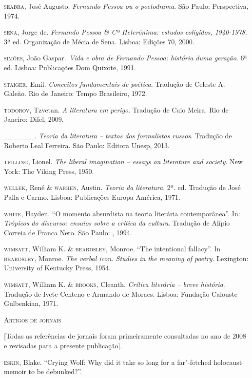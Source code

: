 \begin{Parskip}
\textsc{seabra}, José Augusto. \emph{Fernando Pessoa ou o poetodrama}.
São Paulo: Perspectiva, 1974.

\textsc{sena}, Jorge de. \emph{Fernando Pessoa \& Cª Heterónima:
estudos coligidos, 1940-1978}. 3ª ed. Organização de Mécia de Sena.
Lisboa: Edições 70, 2000.

\textsc{simões}, João Gaspar.~\emph{Vida e obra de Fernando Pessoa:
história duma geração}. 6ª ed. Lisboa: Publicações Dom Quixote, 1991.

\textsc{staiger}, Emil. \emph{Conceitos fundamentais de poética.}
Tradução de Celeste A. Galeão. Rio de Janeiro: Tempo Brasileiro, 1972.

\textsc{todorov, T}zvetan. \emph{A literatura em perigo}. Tradução de
Caio Meira. Rio de Janeiro: Difel, 2009.

\_\_\_\_\_\_. \emph{Teoria da literatura -- textos dos formalistas
russos}. Tradução de Roberto Leal Ferreira. São Paulo: Editora Unesp,
2013.

\textsc{trilling}, Lionel. \emph{The liberal imagination -- essays on
literature and society}. New York: The Viking Press, 1950.

\textsc{wellek,} René \textsc{\& warren,} Austin. \emph{Teoria da
literatura}. 2ª. ed. Tradução de José Palla e Carmo. Lisboa: Publicações
Europa América, 1971.

\textsc{white}, Hayden. ``O momento absurdista na teoria literária
contemporânea''. In: \emph{Trópicos do discurso: ensaios sobre a
crítica da cultura}. Tradução de Alípio Correia de Franca Neto. São
Paulo: , 1994.

\textsc{wimsatt}, William K. \& \textsc{beardsley}, Monroe. ``The
intentional fallacy''. In \textsc{beardsley}, Monroe. \emph{The verbal
icon. Studies in the meaning of poetry}. Lexington: University of
Kentucky Press, 1954.

\textsc{wimsatt}, William K. \& \textsc{brooks}, Cleanth. \emph{Crítica
literária -- breve história}. Tradução de Ivete Centeno e Armando de
Moraes. Lisboa: Fundação Calouste Gulbenkian, 1971.

\pagebreak

\textsc{Artigos de jornais}

{[}Todas as referências de jornais foram primeiramente consultadas no
ano de 2008 e revisadas para a presente publicação{]}.

\textsc{eskin}, Blake. ``Crying Wolf: Why did it take so long for a
far"-fetched holocaust memoir to be debunked?''. 


\end{Parskip}
